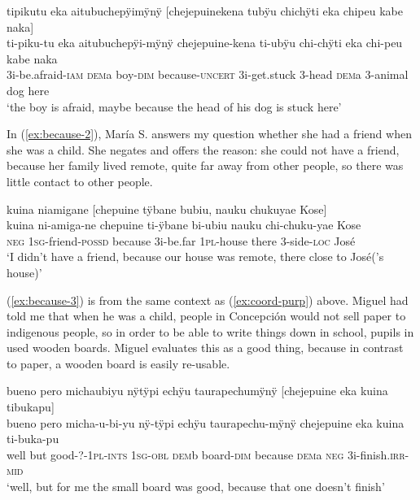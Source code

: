 \ea\label{ex:because-1}
\begingl
\glpreamble tipikutu eka aitubuchepÿimÿnÿ \textup{[}chejepuinekena tubÿu chichÿti eka chipeu kabe naka\textup{]}\\
\gla ti-piku-tu eka aitubuchepÿi-mÿnÿ chejepuine-kena ti-ubÿu chi-chÿti eka chi-peu kabe naka\\
\glb 3i-be.afraid-\textsc{iam} \textsc{dem}a boy-\textsc{dim} because-\textsc{uncert} 3i-get.stuck 3-head \textsc{dem}a 3-animal dog here\\
\glft ‘the boy is afraid, maybe because the head of his dog is stuck here’
\endgl
\trailingcitation{[mox-a110920l-2.056-057]}
\xe

In (\ref{ex:because-2}), María S. answers my question whether she had a friend when she was a child. She negates and offers the reason: she could not have a friend, because her family lived remote, quite far away from other people, so there was little contact to other people.

\ea\label{ex:because-2}
\begingl
\glpreamble kuina niamigane \textup{[}chepuine tÿbane bubiu, nauku chukuyae Kose\textup{]}\\
\gla kuina ni-amiga-ne chepuine ti-ÿbane bi-ubiu nauku chi-chuku-yae Kose\\
\glb \textsc{neg} 1\textsc{sg}-friend-\textsc{possd} because 3i-be.far 1\textsc{pl}-house there 3-side-\textsc{loc} José\\
\glft ‘I didn’t have a friend, because our house was remote, there close to José(’s house)’
\endgl
\trailingcitation{[rxx-p181101l-2.115]}
\xe

(\ref{ex:because-3}) is from the same context as (\ref{ex:coord-purp}) above. Miguel had told me that when he was a child, people in Concepción would not sell paper to indigenous people, so in order to be able to write things down in school, pupils in  used wooden boards. Miguel evaluates this as a good thing, because in contrast to paper, a wooden board is easily re-usable.

\ea\label{ex:because-3}
\begingl
\glpreamble bueno pero michaubiyu nÿtÿpi echÿu taurapechumÿnÿ \textup{[}chejepuine eka kuina tibukapu\textup{]}\\
\gla bueno pero micha-u-bi-yu nÿ-tÿpi echÿu taurapechu-mÿnÿ chejepuine eka kuina ti-buka-pu\\
\glb well but good-?-1\textsc{pl}-\textsc{ints} 1\textsc{sg}-\textsc{obl} \textsc{dem}b board-\textsc{dim} because \textsc{dem}a \textsc{neg} 3i-finish.\textsc{irr}-\textsc{mid}\\
\glft ‘well, but for me the small board was good, because that one doesn’t finish’
\endgl
\trailingcitation{[mxx-p181027l-1.032-033]}
\xe

